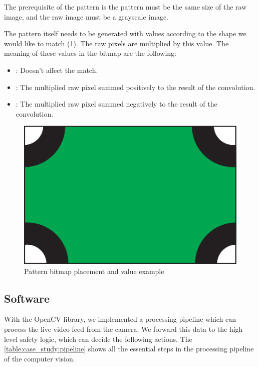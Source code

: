 The prerequisite of the pattern is the pattern must be the same size of the raw image, and the raw image must be a grayscale image.

The pattern itself needs to be generated with values according to the shape we would like to match (\cref{fig:case_study:convoluter_image}). The raw pixels are multiplied by this value. The meaning of these values in the bitmap are the following: 
\begin{itemize}
	\item {}: Doesn't affect the match.
	\item {}: The multiplied raw pixel summed positively to the result of the convolution.
	\item {}: The multiplied raw pixel summed negatively to the result of the convolution.
\end{itemize}

\begin{figure}[h]
	\centering
	\includegraphics[valign=c,width=.5\linewidth]{include/figures/chapter_6/math_2}
	\caption{Pattern bitmap placement and value example}
	\label{fig:case_study:convoluter_image}
\end{figure}

\subsection{Software}

With the OpenCV library, we implemented a processing pipeline which can process the live video feed from the camera. We forward this data to the high level safety logic, which can decide the following actions. The \cref{table:case_study:pipeline} shows all the essential steps in the processing pipeline of the computer vision.

